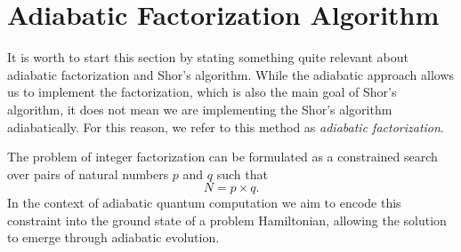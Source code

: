 \section{Adiabatic Factorization Algorithm}
\label{Section:AFA}

It is worth to start this section by stating something quite relevant about adiabatic factorization and Shor's algorithm. While the adiabatic approach allows us to implement the factorization, which is also the main goal of Shor's algorithm, it does not mean we are implementing the Shor's algorithm adiabatically. For this reason, we refer to this method as \textit{adiabatic factorization}.

The problem of integer factorization can be formulated as a constrained search over pairs of natural numbers $p$ and $q$ such that
\begin{equation}
	N = p \times q.
	\label{eq:integer_factorization}
\end{equation}
In the context of adiabatic quantum computation we aim to encode this constraint into the ground state of a problem Hamiltonian, allowing the solution to emerge through adiabatic evolution.

